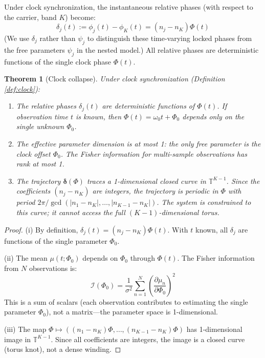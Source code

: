 \documentclass[12pt]{article}
\newtheorem{theorem}{Theorem}
\newcommand{\T}{\mathbb{T}}
\newcommand{\FIM}{\mathcal{I}}
\begin{document}
Under clock synchronization, the instantaneous relative phases (with respect to the carrier, band $K$) become:
\begin{equation}
\delta_j(t) := \phi_j(t) - \phi_K(t) = (n_j - n_K)\Phi(t)
\end{equation}
(We use $\delta_j$ rather than $\psi_j$ to distinguish these time-varying locked phases from the free parameters $\psi_j$ in the nested model.) All relative phases are deterministic functions of the single clock phase $\Phi(t)$.

\begin{theorem}[Clock collapse]
\label{thm:clock}
Under clock synchronization (Definition \ref{def:clock}):
\begin{enumerate}
    \item[(i)] The relative phases $\delta_j(t)$ are deterministic functions of $\Phi(t)$. If observation time $t$ is known, then $\Phi(t) = \omega_0 t + \Phi_0$ depends only on the single unknown $\Phi_0$.

    \item[(ii)] The effective parameter dimension is at most 1: the only free parameter is the clock offset $\Phi_0$. The Fisher information for multi-sample observations has rank at most 1.

    \item[(iii)] The trajectory $\bm{\delta}(\Phi)$ traces a 1-dimensional closed curve in $\T^{K-1}$. Since the coefficients $(n_j - n_K)$ are integers, the trajectory is periodic in $\Phi$ with period $2\pi/\gcd(|n_1 - n_K|, \ldots, |n_{K-1} - n_K|)$. The system is constrained to this curve; it cannot access the full $(K-1)$-dimensional torus.
\end{enumerate}
\end{theorem}

\begin{proof}
(i) By definition, $\delta_j(t) = (n_j - n_K)\Phi(t)$. With $t$ known, all $\delta_j$ are functions of the single parameter $\Phi_0$.

(ii) The mean $\mu(t; \Phi_0)$ depends on $\Phi_0$ through $\Phi(t)$. The Fisher information from $N$ observations is:
\begin{equation}
\FIM(\Phi_0) = \frac{1}{\sigma^2} \sum_{n=1}^{N} \left(\frac{\partial \mu_n}{\partial \Phi_0}\right)^2
\end{equation}
This is a sum of scalars (each observation contributes to estimating the single parameter $\Phi_0$), not a matrix---the parameter space is 1-dimensional.

(iii) The map $\Phi \mapsto ((n_1 - n_K)\Phi, \ldots, (n_{K-1} - n_K)\Phi)$ has 1-dimensional image in $\T^{K-1}$. Since all coefficients are integers, the image is a closed curve (torus knot), not a dense winding.
\end{proof}
\end{document}
